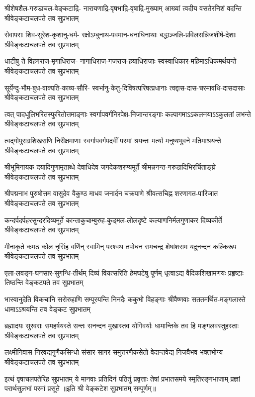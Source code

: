 \fourlineindentedshloka
{श्रीशेषशैल-गरुडाचल-वेङ्कटाद्रि-}
{नारायणाद्रि-वृषभाद्रि-वृषाद्रि-मुख्याम्}
{आख्यां त्वदीय वसतेरनिशं वदन्ति}
{श्रीवेङ्कटाचलपते तव सुप्रभातम्}

\fourlineindentedshloka
{सेवापराः शिव-सुरेश-कृशानु-धर्म-}
{रक्षोऽम्बुनाथ-पवमान-धनाधिनाथाः}
{बद्धाञ्जलि-प्रविलसन्निजशीर्ष-देशाः}
{श्रीवेङ्कटाचलपते तव सुप्रभातम्}

\fourlineindentedshloka
{धाटीषु ते विहगराज-मृगाधिराज-}
{नागाधिराज-गजराज-हयाधिराजाः}
{स्वस्वाधिकार-महिमाऽधिकमर्थयन्ते}
{श्रीवेङ्कटाचलपते तव सुप्रभातम्}

\fourlineindentedshloka
{सूर्येन्दु-भौम-बुध-वाक्पति-काव्य-सौरि-}
{स्वर्भानु-केतु-दिविषत्परिषत्प्रधानाः}
{त्वद्दास-दास-चरमावधि-दासदासाः}
{श्रीवेङ्कटाचलपते तव सुप्रभातम्}

\fourlineindentedshloka
{त्वत् पादधूलिभरितस्फुरितोत्तमाङ्गाः}
{स्वर्गापवर्गनिरपेक्ष-निजान्तरङ्गाः}
{कल्पागमाऽऽकलनयाऽऽकुलतां लभन्ते}
{श्रीवेङ्कटाचलपते तव सुप्रभातम्}

\fourlineindentedshloka
{त्वद्गोपुराग्रशिखराणि निरीक्षमाणाः}
{स्वर्गापवर्गपदवीं परमां श्रयन्तः}
{मर्त्या मनुष्यभुवने मतिमाश्रयन्ते}
{श्रीवेङ्कटाचलपते तव सुप्रभातम्}

\fourlineindentedshloka
{श्रीभूमिनायक दयादिगुणामृताब्धे}
{देवाधिदेव जगदेकशरण्यमूर्ते}
{श्रीमन्ननन्त-गरुडादिभिरर्चिताङ्घ्रे}
{श्रीवेङ्कटाचलपते तव सुप्रभातम्}

\fourlineindentedshloka
{श्रीपद्मनाभ पुरुषोत्तम वासुदेव}
{वैकुण्ठ माधव जनार्दन चक्रपाणे}
{श्रीवत्सचिह्न शरणागत-पारिजात}
{श्रीवेङ्कटाचलपते तव सुप्रभातम्}

\fourlineindentedshloka
{कन्दर्पदर्पहरसुन्दरदिव्यमूर्ते}
{कान्ताकुचाम्बुरुह-कुड्मल-लोलदृष्टे}
{कल्याणनिर्मलगुणाकर दिव्यकीर्ते}
{श्रीवेङ्कटाचलपते तव सुप्रभातम्}

\fourlineindentedshloka
{मीनाकृते कमठ कोल नृसिंह वर्णिन्}
{स्वामिन् परश्वथ तपोधन रामचन्द्र}
{शेषांशराम यदुनन्दन कल्किरूप}
{श्रीवेङ्कटाचलपते तव सुप्रभातम्}

\fourlineindentedshloka
{एला-लवङ्ग-घनसार-सुगन्धि-तीर्थम्}
{दिव्यं वियत्सरिति हेमघटेषु पूर्णम्}
{धृत्वाऽद्य वैदिकशिखामणयः प्रहृष्टाः}
{तिष्ठन्ति वेङ्कटपते तव सुप्रभातम्}

\fourlineindentedshloka
{भास्वानुदेति विकचानि सरोरुहाणि}
{सम्पूरयन्ति निनदैः ककुभो विहङ्गाः}
{श्रीवैष्णवाः सततमर्थित-मङ्गलास्ते}
{धामाऽऽश्रयन्ति तव वेङ्कट सुप्रभातम्}

\fourlineindentedshloka
{ब्रह्मादयः सुरवराः समहर्षयस्ते}
{सन्तः सनन्दन मुखास्तव योगिवर्याः}
{धामान्तिके तव हि मङ्गलवस्तुहस्ताः}
{श्रीवेङ्कटाचलपते तव सुप्रभातम्}

\fourlineindentedshloka
{लक्ष्मीनिवास निरवद्यगुणैकसिन्धो}
{संसार-सागर-समुत्तरणैकसेतो}
{वेदान्तवेद्य निजवैभव भक्तभोग्य}
{श्रीवेङ्कटाचलपते तव सुप्रभातम्}

\fourlineindentedshloka
{इत्थं वृषाचलपतेरिह सुप्रभातम्}
{ये मानवाः प्रतिदिनं पठितुं प्रवृत्ताः}
{तेषां प्रभातसमये स्मृतिरङ्गभाजाम्}
{प्रज्ञां परार्थसुलभां परमां प्रसूते}
॥इति श्री वेङ्कटेश सुप्रभातम् सम्पूर्णम्॥